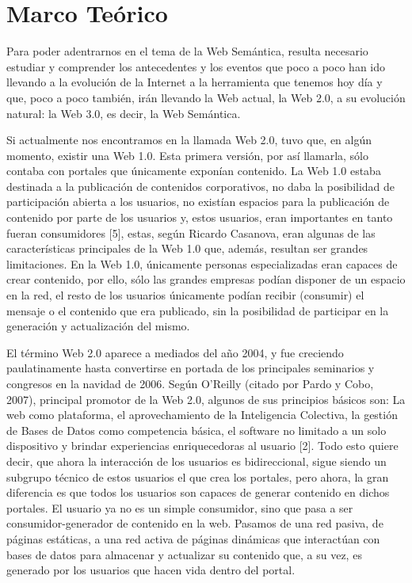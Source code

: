 \chapter{Marco Teórico}
\label{chap:marcoTeorico}

Para poder adentrarnos en el tema de la Web Semántica, resulta necesario estudiar y comprender los antecedentes y los eventos que poco a poco han ido llevando a la evolución de la Internet a la herramienta que tenemos hoy día y que, poco a poco también, irán llevando la Web actual, la Web 2.0, a su evolución natural: la Web 3.0, es decir, la Web Semántica.

Si actualmente nos encontramos en la llamada Web 2.0, tuvo que, en algún momento, existir una Web 1.0. Esta primera versión, por así llamarla, sólo contaba con portales que únicamente exponían contenido. La Web 1.0 estaba destinada a la publicación de contenidos corporativos, no daba la posibilidad de participación abierta a los usuarios, no existían espacios para la publicación de contenido por parte de los usuarios y, estos usuarios, eran importantes en tanto fueran consumidores [5], estas, según Ricardo Casanova, eran algunas de las características principales de la Web 1.0 que, además, resultan ser grandes limitaciones. En la Web 1.0, únicamente personas especializadas eran capaces de crear contenido, por ello, sólo las grandes empresas podían disponer de un espacio en la red, el resto de los usuarios únicamente podían recibir (consumir) el mensaje o el contenido que era publicado, sin la posibilidad de participar en la generación y actualización del mismo.

El término Web 2.0 aparece a mediados del año 2004, y fue creciendo paulatinamente hasta convertirse en portada de los principales seminarios y congresos en la navidad de 2006. Según O'Reilly (citado por Pardo y Cobo, 2007), principal promotor de la Web 2.0, algunos de sus principios básicos son: La web como plataforma, el aprovechamiento de la Inteligencia Colectiva, la gestión de Bases de Datos como competencia básica, el software no limitado a un solo dispositivo y brindar experiencias enriquecedoras al usuario [2]. Todo esto quiere decir, que ahora la interacción de los usuarios es bidireccional, sigue siendo un subgrupo técnico de estos usuarios el que crea los portales, pero ahora, la gran diferencia es que todos los usuarios son capaces de generar contenido en dichos portales. El usuario ya no es un simple consumidor, sino que pasa a ser consumidor-generador de contenido en la web. Pasamos de una red pasiva, de páginas estáticas, a una red activa de páginas dinámicas que interactúan con bases de datos para almacenar y actualizar su contenido que, a su vez, es generado por los usuarios que hacen vida dentro del portal. 

